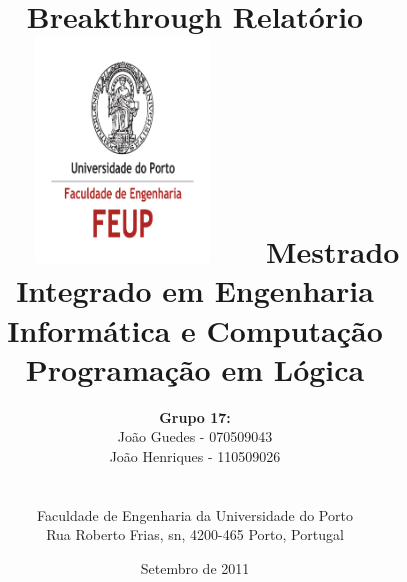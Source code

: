 \documentclass[15pt,a4paper]{article}
\begin{document}
\setlength{\textwidth}{16cm}
\setlength{\textheight}{22cm}



\title{
	\Huge\textbf{Breakthrough}
	\linebreak\linebreak\linebreak
	\Large\textbf{Relatório}
	\linebreak\linebreak
	\includegraphics[height=6cm, width=7cm]{feup.pdf}
	\linebreak \linebreak
	\Large{Mestrado Integrado em Engenharia Informática e Computação}
	\linebreak\linebreak
	\Large{Programação em Lógica}\linebreak
}


\author{\textbf{Grupo 17:}
\\ João Guedes - 070509043
\\ João Henriques - 110509026
\\\linebreak\linebreak \\
\\ Faculdade de Engenharia da Universidade do Porto
\\ Rua Roberto Frias, s\/n, 4200-465 Porto, Portugal
\linebreak\linebreak\linebreak
\linebreak\linebreak\vspace{1cm}}
\date{Setembro de 2011}
\maketitle
\thispagestyle{empty}
\end{document}
